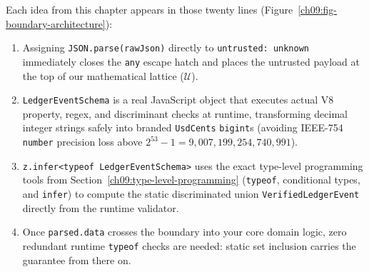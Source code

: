 Each idea from this chapter appears in those twenty lines (Figure~\ref{ch09:fig-boundary-architecture}):
\begin{enumerate}
  \item Assigning \texttt{JSON.parse(rawJson)} directly to \texttt{untrusted: unknown} immediately closes the \texttt{any} escape hatch and places the untrusted payload at the top of our mathematical lattice ($\mathcal{U}$).
  \item \texttt{LedgerEventSchema} is a real JavaScript object that executes actual V8 property, regex, and discriminant checks at runtime, transforming decimal integer strings safely into branded \texttt{UsdCents} \texttt{bigint}s (avoiding IEEE-754 \texttt{number} precision loss above $2^{53} - 1 = 9{,}007{,}199{,}254{,}740{,}991$).
  \item \texttt{z.infer<typeof LedgerEventSchema>} uses the exact type-level programming tools from Section~\ref{ch09:type-level-programming} (\texttt{typeof}, conditional types, and \texttt{infer}) to compute the static discriminated union \texttt{VerifiedLedgerEvent} directly from the runtime validator.
  \item Once \texttt{parsed.data} crosses the boundary into your core domain logic, zero redundant runtime \texttt{typeof} checks are needed: static set inclusion carries the guarantee from there on.
\end{enumerate}

